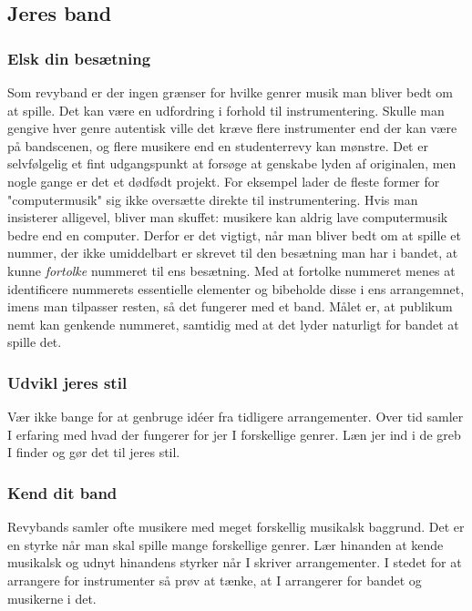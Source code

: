 \subsection{Jeres band}
\subsubsection{Elsk din besætning}
Som revyband er der ingen grænser for hvilke genrer musik man bliver bedt om at spille.
Det kan være en udfordring i forhold til instrumentering.
Skulle man gengive hver genre autentisk ville det kræve flere instrumenter end der kan være på bandscenen, og flere musikere end en studenterrevy kan mønstre.
Det er selvfølgelig et fint udgangspunkt at forsøge at genskabe lyden af originalen, men nogle gange er det et dødfødt projekt.
For eksempel lader de fleste former for "computermusik" sig ikke oversætte direkte til instrumentering.
Hvis man insisterer alligevel, bliver man skuffet: musikere kan aldrig lave computermusik bedre end en computer.
Derfor er det vigtigt, når man bliver bedt om at spille et nummer, der ikke umiddelbart er skrevet til den besætning man har i bandet, at kunne \textit{fortolke} nummeret til ens besætning.
Med at fortolke nummeret menes at identificere nummerets essentielle elementer og bibeholde disse i ens arrangemnet, imens man tilpasser resten, så det fungerer med et band.
Målet er, at publikum nemt kan genkende nummeret, samtidig med at det lyder naturligt for bandet at spille det.

\subsubsection{Udvikl jeres stil}
Vær ikke bange for at genbruge idéer fra tidligere arrangementer. Over tid samler I erfaring med hvad der fungerer for jer I forskellige genrer. Læn jer ind i de greb I finder og gør det til jeres stil.

\subsubsection{Kend dit band}
Revybands samler ofte musikere med meget forskellig musikalsk baggrund. Det er  en styrke når man skal spille mange forskellige genrer.
Lær hinanden at kende musikalsk og udnyt hinandens styrker når I skriver arrangementer.
I stedet for at arrangere for instrumenter så prøv at tænke, at I arrangerer for bandet og musikerne i det.